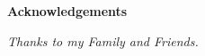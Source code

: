 \thispagestyle{empty}

\begin{center}
  {\bf \Huge Acknowledgements}
\end{center}

\vspace{4cm}


\emph{
  Thanks to my Family and Friends.
}
